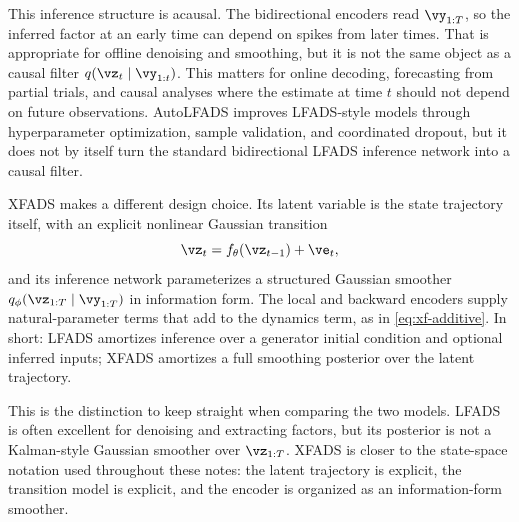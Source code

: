 \documentclass[11pt]{article}
\theoremstyle{plain}
\theoremstyle{definition}
\theoremstyle{remark}
\theoremstyle{definition}
\begin{document}
This inference structure is acausal. The bidirectional encoders read
$\vy_{1:T}$, so the inferred factor at an early time can depend on spikes from
later times. That is appropriate for offline denoising and smoothing, but it is
not the same object as a causal filter $q(\vz_t\mid\vy_{1:t})$. This matters for
online decoding, forecasting from partial trials, and causal analyses where the
estimate at time $t$ should not depend on future observations. AutoLFADS
\parencite{Keshtkaran2019-autolfads} improves LFADS-style models through
hyperparameter optimization, sample validation, and coordinated dropout, but it
does not by itself turn the standard bidirectional LFADS inference network into a
causal filter.

XFADS makes a different design choice. Its latent variable is the state trajectory
itself, with an explicit nonlinear Gaussian transition
\[
    \vz_t = f_{\theta}(\vz_{t-1}) + \ve_t,
\]
and its inference network parameterizes a structured Gaussian smoother
$q_{\phi}(\vz_{1:T}\mid\vy_{1:T})$ in information form. The local and backward
encoders supply natural-parameter terms that add to the dynamics term, as in
\eqref{eq:xf-additive}. In short: LFADS amortizes inference over a generator
initial condition and optional inferred inputs; XFADS amortizes a full smoothing
posterior over the latent trajectory.

This is the distinction to keep straight when comparing the two models. LFADS is
often excellent for denoising and extracting factors, but its posterior is not a
Kalman-style Gaussian smoother over $\vz_{1:T}$. XFADS is closer to the state-space
notation used throughout these notes: the latent trajectory is explicit, the
transition model is explicit, and the encoder is organized as an information-form
smoother.

\printbibliography
\end{document}

